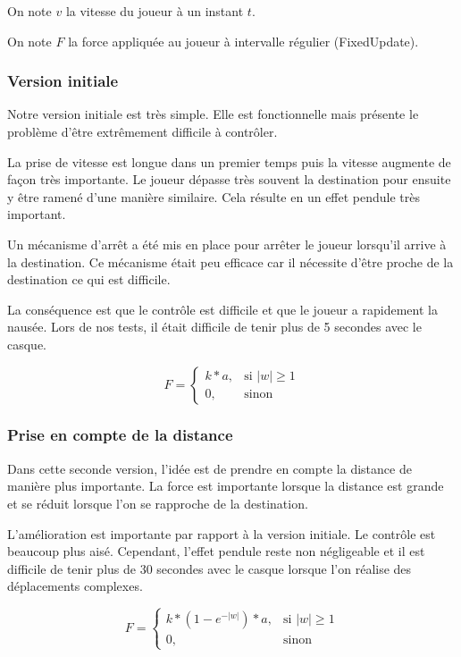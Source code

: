 \documentclass[a4paper]{elsarticle}
\begin{document}
On note $v$ la vitesse du joueur à un instant $t$.

On note $F$ la force appliquée au joueur à intervalle régulier (FixedUpdate).

\subsubsection{Version initiale}

Notre version initiale est très simple. Elle est fonctionnelle mais présente le problème d'être extrêmement difficile à contrôler.

La prise de vitesse est longue dans un premier temps puis la vitesse augmente de façon très importante. Le joueur dépasse très souvent la destination pour ensuite y être ramené d'une manière similaire. Cela résulte en un \og effet pendule \fg{} très important.

Un mécanisme d'arrêt a été mis en place pour arrêter le joueur lorsqu'il arrive à la destination. Ce mécanisme était peu efficace car il nécessite d'être proche de la destination ce qui est difficile.

La conséquence est que le contrôle est difficile et que le joueur a rapidement la nausée. Lors de nos tests, il était difficile de tenir plus de 5 secondes avec le casque.

\begin{equation}
    F = 
\begin{cases}
    k * a,& \text{si } |w| \geq 1\\
    0,              & \text{sinon}
\end{cases}
\end{equation}

\subsubsection{Prise en compte de la distance}

Dans cette seconde version, l'idée est de prendre en compte la distance de manière plus importante. La force est importante lorsque la distance est grande et se réduit lorsque l'on se rapproche de la destination.

L'amélioration est importante par rapport à la version initiale. Le contrôle est beaucoup plus aisé. Cependant, \og l'effet pendule \fg{} reste non négligeable et il est difficile de tenir plus de 30 secondes avec le casque lorsque l'on réalise des déplacements complexes.

\begin{equation}
    F = 
\begin{cases}
    k * (1 - e^{-|w|}) * a,& \text{si } |w| \geq 1\\
    0,              & \text{sinon}
\end{cases}
\end{equation}
\end{document}
